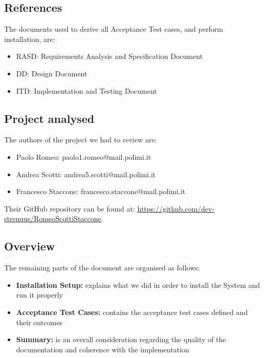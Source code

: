 \documentclass[titlepage]{article}
\begin{document}
\subsection{References}
The documents used to derive all Acceptance Test cases, and perform installation, are:
\begin{itemize}
    \item {RASD:} Requirements Analysis and Specification Document
    \item{DD:} Design Document
    \item{ITD:} Implementation and Testing Document
\end{itemize}

\subsection{Project analysed}
The authors of the project we had to review are:
\begin{itemize}
    \item {Paolo Romeo:} paolo1.romeo@mail.polimi.it
    \item{Andrea Scotti:} andrea5.scotti@mail.polimi.it
    \item{Francesco Staccone:} francesco.staccone@mail.polimi.it
\end{itemize}

\noindent
Their GitHub repository can be found at: \href{https://github.com/dev-strenuus/RomeoScottiStaccone}{https://github.com/dev-strenuus/RomeoScottiStaccone}. 



\subsection{Overview}
The remaining parts of the document are organised as follows:
\begin{itemize}

\item {\bf Installation Setup:}
explains what we did in order to install the System and run it properly

\item {\bf Acceptance Test Cases:}
contains the acceptance test cases defined and their outcomes

\item {\bf Summary:}
is an overall consideration regarding the quality of the documentation and coherence with the implementation

\end{itemize}
\end{document}
